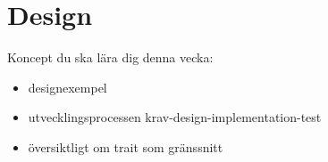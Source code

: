 \chapter{Design}\label{chapter:W13}
Koncept du ska lära dig denna vecka:
\begin{multicols}{2}\begin{itemize}[nosep,label={$\square$},leftmargin=*]
\item designexempel
\item utvecklingsprocessen krav-design-implementation-test
\item översiktligt om trait som gränssnitt\end{itemize}\end{multicols}
